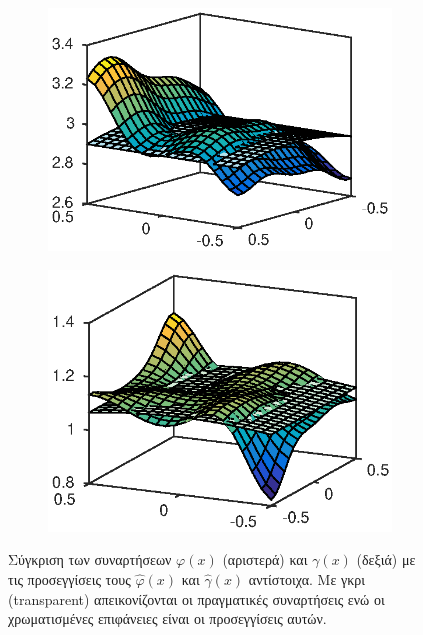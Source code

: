 \begin{figure}
	\begin{subfigure}{0.5\textwidth}
		\includegraphics{plots/experiments/2dof/g11_hat.eps}
	\end{subfigure}
	\begin{subfigure}{0.5\textwidth}
		\includegraphics{plots/experiments/2dof/g12_hat.eps}
	\end{subfigure}
	\caption{Σύγκριση των συναρτήσεων $\varphi(x)$ (αριστερά) και $\gamma(x)$ (δεξιά) με τις προσεγγίσεις τους $\hat{\varphi}(x)$ και $\hat{\gamma}(x)$ αντίστοιχα. Με γκρι (transparent) απεικονίζονται οι πραγματικές συναρτήσεις ενώ οι χρωματισμένες επιφάνειες είναι οι προσεγγίσεις αυτών. }
	\label{fig:2dof_g1_approximations}
\end{figure}

